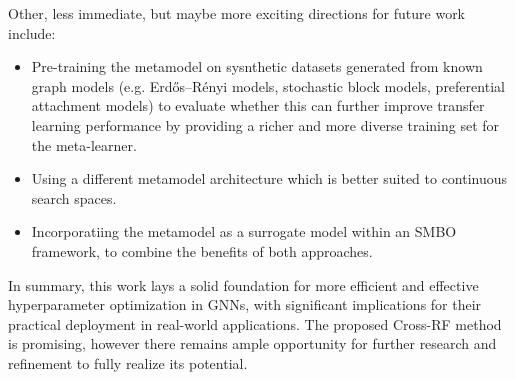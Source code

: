 Other, less immediate, but maybe more exciting directions for future work include:
\begin{itemize}
	\item Pre-training the metamodel on sysnthetic datasets generated from known graph models (e.g. Erdős–Rényi models, stochastic block models, preferential attachment models) to evaluate whether this can further improve transfer learning performance by providing a richer and more diverse training set for the meta-learner.
	\item Using a different metamodel architecture which is better suited to continuous search spaces.
	\item Incorporatiing the metamodel as a surrogate model within an SMBO framework, to combine the benefits of both approaches.
\end{itemize}

In summary, this work lays a solid foundation for more efficient and effective hyperparameter optimization in GNNs, with significant implications for their practical deployment in real-world applications. The proposed Cross-RF method is promising, however there remains ample opportunity for further research and refinement to fully realize its potential.

